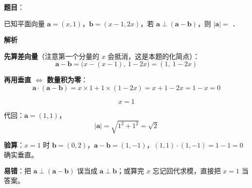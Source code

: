 \begin{answer}

\textbf{题目}：

已知平面向量 $\boldsymbol{a}=(x,1)$，$\boldsymbol{b}=(x-1,2x)$，若 $\boldsymbol{a}\perp(\boldsymbol{a}-\boldsymbol{b})$，则 $|\boldsymbol{a}|=$ \gkblank{}．

\textbf{解析}

\textbf{先算差向量}（注意第一个分量的 $x$ 会抵消，这是本题的化简点）：
\nopagebreak[4]
\[\boldsymbol{a}-\boldsymbol{b}=\big(x-(x-1),\ 1-2x\big)=(1,\ 1-2x)\]

\textbf{再用垂直 $\iff$ 数量积为零}：
\nopagebreak[4]
\[\boldsymbol{a}\cdot(\boldsymbol{a}-\boldsymbol{b})=x\times1+1\times(1-2x)=x+1-2x=1-x=0\]

\nopagebreak[4]
\[x=1\]

代回：$\boldsymbol{a}=(1,1)$，
\nopagebreak[4]
\[|\boldsymbol{a}|=\sqrt{1^2+1^2}=\sqrt2\]

\begin{gktip}
\textbf{验算}：$x=1$ 时 $\boldsymbol b=(0,2)$，$\boldsymbol a-\boldsymbol b=(1,-1)$，$(1,1)\cdot(1,-1)=1-1=0$  确实垂直。

\textbf{易错}：把 $\boldsymbol a\perp(\boldsymbol a-\boldsymbol b)$ 误当成 $\boldsymbol a\perp\boldsymbol b$；或算完 $x$ 忘记回代求模，直接把 $x=1$ 当答案。
\end{gktip}


\par\medskip

\end{answer}
